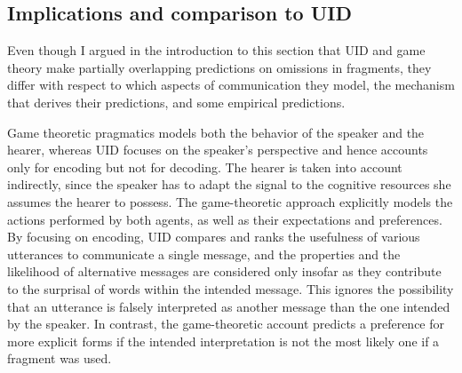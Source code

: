 \subsection{Implications and comparison to UID}
Even though I argued in the introduction to this section that UID and game theory make partially overlapping predictions on omissions in fragments, they differ with respect to which aspects of communication they model, the mechanism that derives their predictions, and some empirical predictions.

Game theoretic pragmatics models both the behavior of the speaker and the hearer, whereas UID focuses on the speaker's perspective and hence accounts only for encoding but not for decoding. The hearer is taken into account indirectly, since the speaker has to adapt the signal to the cognitive resources she assumes the hearer to possess. The game-theoretic approach explicitly models the actions performed by both agents, as well as their expectations and preferences. By focusing on encoding, UID compares and ranks the usefulness of various utterances to communicate a single message, and the properties and the likelihood of alternative messages are considered only insofar as they contribute to the surprisal of words within the intended message. This ignores the possibility that an utterance is falsely interpreted as another message than the one intended by the speaker. In contrast, the game-theoretic account predicts a preference for more explicit forms if the intended interpretation is not the most likely one if a fragment was used.

